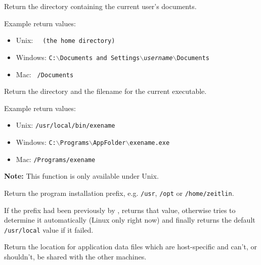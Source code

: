 
Return the directory containing the current user's documents.

Example return values:
\begin{itemize}
    \item Unix: \tt{~} (the home directory)
    \item Windows: \texttt{C:$\backslash$Documents and Settings$\backslash$\textit{username}$\backslash$Documents}
    \item Mac: \texttt{~/Documents}
\end{itemize}



\label{wxstandardpathsgetexecutablepath}


Return the directory and the filename for the current executable.

Example return values:
\begin{itemize}
    \item Unix: \texttt{/usr/local/bin/exename}
    \item Windows: \texttt{C:$\backslash$Programs$\backslash$AppFolder$\backslash$exename.exe}
    \item Mac: \texttt{/Programs/exename}
\end{itemize}



\label{wxstandardpathsgetinstallprefix}


\textbf{Note: } This function is only available under Unix.

Return the program installation prefix, e.g. \texttt{/usr}, \texttt{/opt} or
\texttt{/home/zeitlin}.

If the prefix had been previously by
, returns that
value, otherwise tries to determine it automatically (Linux only right
now) and finally returns the default \texttt{/usr/local} value if it failed.


\label{wxstandardpathsgetlocaldatadir}


Return the location for application data files which are host-specific and
can't, or shouldn't, be shared with the other machines.

